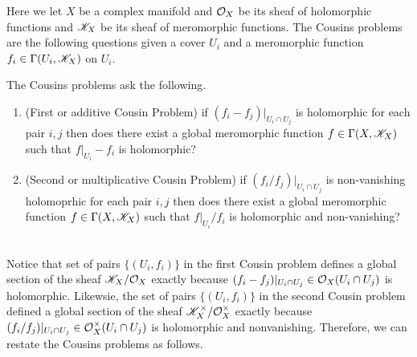 \documentclass[12pt]{article}
\begin{document}
Here we let $X$ be a complex manifold and $\mathcal{O}_{X}$ be its sheaf of holomorphic functions and $\mathscr{K}_X$ be its sheaf of meromorphic functions. The Cousins problems are the following questions given a cover $U_i$ and a meromorphic function $f_i \in \Gamma(U_i, \mathscr{K}_X)$ on $U_i$. 

\begin{defn}
The Cousins problems ask the following. 
\begin{enumerate}
\item (First or additive Cousin Problem) if $(f_i - f_j)|_{U_i \cap U_j}$ is holomorphic for each pair $i,j$ then does there exist a global meromorphic function $f \in \Gamma(X, \mathscr{K}_X)$ such that $f|_{U_i} - f_i$ is holomorphic?
\item (Second or multiplicative Cousin Problem) if $(f_i / f_j)|_{U_i \cap U_j}$ is non-vanishing holomoprhic for each pair $i,j$ then does there exist a global meromorphic function $f \in \Gamma(X, \mathscr{K}_X)$ such that $f|_{U_i} / f_i$ is holomorphic and non-vanishing?
\end{enumerate}
\end{defn}
\noindent\\
Notice that set of pairs $\{ (U_i, f_i) \}$ in the first Cousin problem defines a global section of the sheaf $\mathscr{K}_X / \mathcal{O}_{X}$ exactly because $(f_i - f_j)|_{U_i \cap U_j} \in \mathcal{O}_{X}(U_i \cap U_j)$ is holomorphic. Likewsie, the set of pairs $\{ (U_i, f_i) \}$ in the second Cousin problem defined a global section of the sheaf $\mathscr{K}_X^\times / \mathcal{O}_{X}^\times$ exactly because $(f_i / f_j) |_{U_i \cap U_j} \in \mathcal{O}_{X}^\times(U_i \cap U_j)$ is holomorphic and nonvanishing. Therefore, we can restate the Cousins problems as follows.
\end{document}
